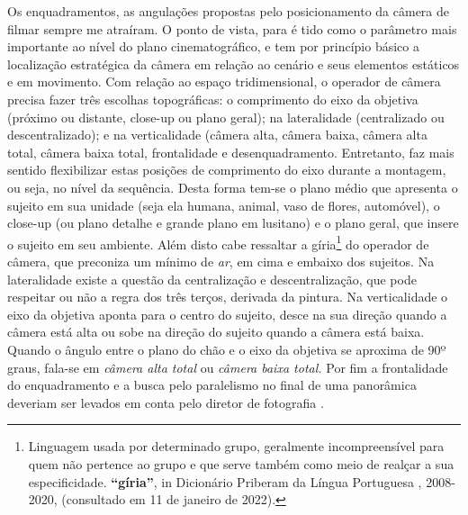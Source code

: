 Os enquadramentos, as angulações propostas pelo posicionamento da
câmera de filmar sempre me atraíram. O ponto de vista, para
\textcite{jullier2009lendo} é tido como o parâmetro mais importante ao
nível do plano cinematográfico, e tem por princípio básico a
localização estratégica da câmera em relação ao cenário e seus
elementos estáticos e em movimento. Com relação ao espaço
tridimensional, o operador de câmera precisa fazer três escolhas
topográficas: o comprimento do eixo da objetiva (próximo ou distante,
close-up ou plano geral); na lateralidade (centralizado ou
descentralizado); e na verticalidade (câmera alta, câmera baixa, câmera
alta total, câmera baixa total, frontalidade e desenquadramento.
Entretanto, faz mais sentido flexibilizar estas posições de comprimento
do eixo durante a montagem, ou seja, no nível da sequência. Desta forma
tem-se o plano médio que apresenta o sujeito em sua unidade (seja ela
humana, animal, vaso de flores, automóvel), o close-up (ou plano
detalhe e grande plano em lusitano) e o plano geral, que insere o
sujeito em seu ambiente. Além disto cabe ressaltar a gíria\footnote{
	Linguagem usada por determinado grupo, geralmente incompreensível para
	quem não pertence ao grupo e que serve também como meio de realçar a
	sua especificidade. \textbf{\enquote{gíria}}, in Dicionário Priberam da
	Língua Portuguesa , 2008-2020,
	(consultado em 11 de janeiro de 2022).} do operador de câmera, que
preconiza um mínimo de \emph{ar}, em cima e embaixo dos sujeitos. Na
lateralidade existe a questão da centralização e descentralização, que
pode respeitar ou não a regra dos três terços, derivada da pintura. Na
verticalidade o eixo da objetiva aponta para o centro do sujeito, desce
na sua direção quando a câmera está alta ou sobe na direção do sujeito
quando a câmera está baixa. Quando o ângulo entre o plano do chão e o
eixo da objetiva se aproxima de 90º graus, fala-se em \emph{câmera alta
	total} ou \emph{câmera baixa total.} Por fim a frontalidade do
enquadramento e a busca pelo paralelismo no final de uma panorâmica
deveriam ser levados em conta pelo diretor de fotografia %
\parencite[22-28]{jullier2009lendo}.


